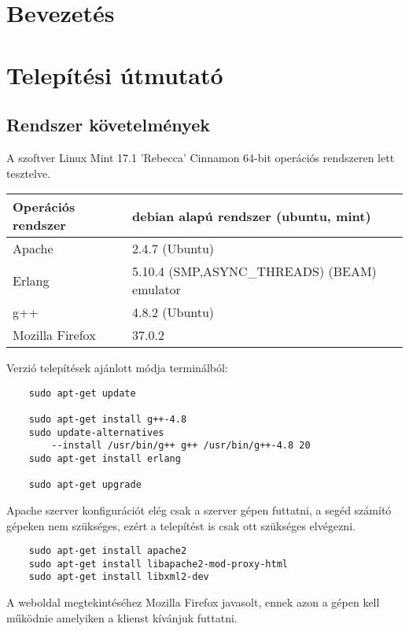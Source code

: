 \begin{comment}
	A Felhasználói dokumentáció tartalmazza
	- a megoldott probléma rövid megfogalmazását,
	- a felhasznált módszerek rövid leírását,
	- a program használatához szükséges összes információt

	Magába foglalja a telepítési- (vagy üzemeltetési-) és a végfelhasználói leírást. Ezek
	meghatározott célközönséghez szólnak, könnyen és gyorsan kell, hogy eligazítsák a
	felhasználót a program használatában!

\end{comment}

\section{Bevezetés}
\section{Telepítési útmutató}
\subsection{Rendszer követelmények}
	A szoftver Linux Mint 17.1 'Rebecca' Cinnamon 64-bit operációs rendszeren lett tesztelve.
	\begin{center}
  	\begin{tabular}{| p{5cm} | p{10cm} |} 
  	\hline
        Operációs rendszer & debian alapú rendszer (ubuntu, mint)
    \\ \hline
        Apache & 2.4.7 (Ubuntu)
    \\ \hline
        Erlang & 5.10.4 (SMP,ASYNC\_THREADS) (BEAM) emulator 
    \\ \hline
        g++ & 4.8.2 (Ubuntu)
    \\ \hline
        Mozilla Firefox & 37.0.2
    \\ \hline
    
    \end{tabular}
    \end{center}

    Verzió telepítések ajánlott módja terminálból:
	\begin{verbatim}
	sudo apt-get update

	sudo apt-get install g++-4.8
	sudo update-alternatives 
	    --install /usr/bin/g++ g++ /usr/bin/g++-4.8 20
	sudo apt-get install erlang

	sudo apt-get upgrade
	\end{verbatim}
	Apache szerver konfigurációt elég csak a szerver gépen futtatni, a segéd számító gépeken nem szükséges, ezért a telepítést is csak ott szükséges elvégezni.
	\begin{verbatim}
	sudo apt-get install apache2
	sudo apt-get install libapache2-mod-proxy-html
	sudo apt-get install libxml2-dev
	\end{verbatim}
	A weboldal megtekintéséhez Mozilla Firefox javasolt, ennek azon a gépen kell működnie amelyiken a klienst kívánjuk futtatni.
